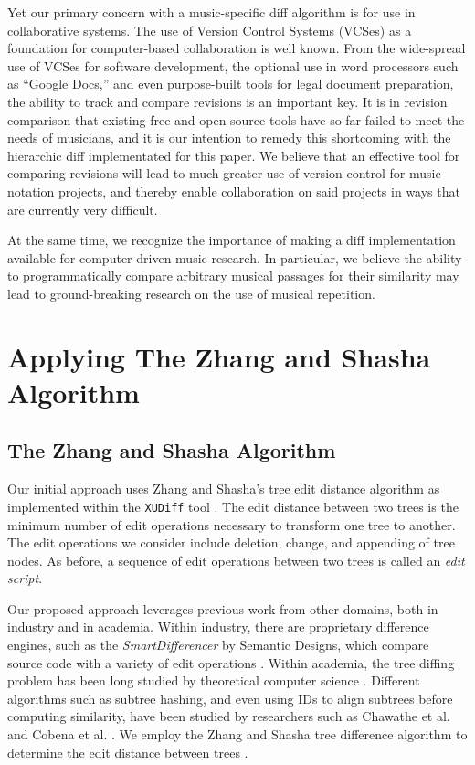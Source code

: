 \documentclass{article}
\begin{document}
Yet our primary concern with a music-specific diff algorithm is for use in collaborative systems.
The use of Version Control Systems (VCSes) as a foundation for computer-based collaboration is well known.
From the wide-spread use of VCSes for software development,
the optional use in word processors such as ``Google Docs,''
and even purpose-built tools for legal document preparation,
the ability to track and compare revisions is an important key.
It is in revision comparison that existing free and open source tools have so far failed to meet the needs of musicians,
and it is our intention to remedy this shortcoming with the hierarchic diff implementated for this paper.
We believe that an effective tool for comparing revisions will lead to much greater use of version control for music notation projects,
and thereby enable collaboration on said projects in ways that are currently very difficult.

At the same time, we recognize the importance of making a diff implementation available for computer-driven music research.
In particular, we believe the ability to programmatically compare arbitrary musical passages for their similarity may lead to
ground-breaking research on the use of musical repetition.


\section{Applying The Zhang and Shasha Algorithm}
\subsection{The Zhang and Shasha Algorithm}
Our initial approach uses Zhang and Shasha's tree edit distance algorithm as implemented within the \texttt{XUDiff} tool \cite{Weaver:2013sl}.
The edit distance between two trees is the minimum number of edit operations necessary to transform one tree to another.
The edit operations we consider include deletion, change, and appending of tree nodes.
As before, a sequence of edit operations between two trees is called an \emph{edit script}.

Our proposed approach leverages previous work from other domains, both in industry and in academia.
Within industry, there are proprietary difference engines, such as the \emph{SmartDifferencer} by Semantic Designs,
which compare source code with a variety of edit operations \cite{Designs:qm}.
Within academia, the tree diffing problem has been long studied by theoretical computer science \cite{Bille:2005ec}.
Different algorithms such as subtree hashing,
and even using IDs to align subtrees before computing similarity,
have been studied by researchers such as Chawathe et al. and Cobena et al. \cite{Chawathe:1996jb,Cobena:2002gd}.
We employ the Zhang and Shasha tree difference algorithm to determine the edit distance between trees \cite{Zhang:1989ec,Zhang:1989il}.
\end{document}
